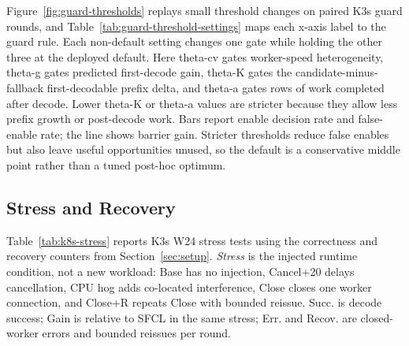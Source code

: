 Figure~\ref{fig:guard-thresholds} replays small threshold changes on paired K3s
guard rounds, and Table~\ref{tab:guard-threshold-settings} maps each x-axis
label to the guard rule.  Each non-default setting changes one gate while
holding the other three at the deployed default.  Here
theta-cv gates worker-speed heterogeneity, theta-g gates
predicted first-decode gain, theta-K gates the candidate-minus-fallback
first-decodable prefix delta, and theta-a gates rows of work completed after
decode.  Lower theta-K or theta-a values are stricter because they allow
less prefix growth or post-decode work.  Bars report enable decision rate and
false-enable rate; the line shows barrier gain.  Stricter thresholds reduce
false enables but also leave useful opportunities unused, so the default is a
conservative middle point rather than a tuned post-hoc optimum.

\subsection{Stress and Recovery}

Table~\ref{tab:k8s-stress} reports K3s W24 stress tests using the correctness
and recovery counters from Section~\ref{sec:setup}.  \emph{Stress} is the
injected runtime condition, not a new workload: Base has no injection, Cancel+20
delays cancellation, CPU hog adds co-located interference, Close closes one
worker connection, and Close+R repeats Close with bounded reissue.  Succ. is
decode success; Gain is relative to SFCL in the same stress; Err. and Recov. are
closed-worker errors and bounded reissues per round.

